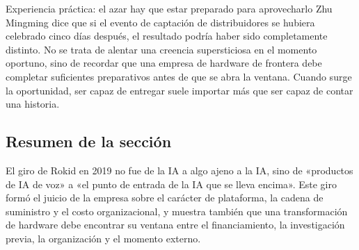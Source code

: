 \begin{knowledgebox}{Experiencia práctica: el azar hay que estar preparado para aprovecharlo}
Zhu Mingming dice que si el evento de captación de distribuidores se hubiera celebrado cinco días después, el resultado podría haber sido completamente distinto. No se trata de alentar una creencia supersticiosa en el momento oportuno, sino de recordar que una empresa de hardware de frontera debe completar suficientes preparativos antes de que se abra la ventana. Cuando surge la oportunidad, ser capaz de entregar suele importar más que ser capaz de contar una historia.
\end{knowledgebox}

\subsection{Resumen de la sección}

El giro de Rokid en 2019 no fue de la IA a algo ajeno a la IA, sino de «productos de IA de voz» a «el punto de entrada de la IA que se lleva encima». Este giro formó el juicio de la empresa sobre el carácter de plataforma, la cadena de suministro y el costo organizacional, y muestra también que una transformación de hardware debe encontrar su ventana entre el financiamiento, la investigación previa, la organización y el momento externo.
